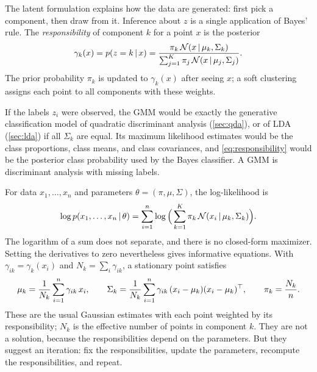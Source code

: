The latent formulation explains how the data are generated: first pick a component, then draw from it. Inference about $z$ is a single application of Bayes' rule. The \emph{responsibility} of component $k$ for a point $x$ is the posterior
\begin{equation}\label{eq:responsibility}
\gamma_k(x)=p(z=k\,|\, x)=\frac{\pi_k\,\mathcal{N}(x\,|\,\mu_k,\Sigma_k)}{\sum_{j=1}^K\pi_j\,\mathcal{N}(x\,|\,\mu_j,\Sigma_j)} .
\end{equation}
The prior probability $\pi_k$ is updated to $\gamma_k(x)$ after seeing $x$; a soft clustering assigns each point to all components with these weights.

\begin{remark}\label{rem:gmm-qda}
If the labels $z_i$ were observed, the GMM would be exactly the generative classification model of quadratic discriminant analysis (\cref{sec:qda}), or of LDA (\cref{sec:lda}) if all $\Sigma_k$ are equal. Its maximum likelihood estimates would be the class proportions, class means, and class covariances, and \eqref{eq:responsibility} would be the posterior class probability used by the Bayes classifier. A GMM is discriminant analysis with missing labels.
\end{remark}

For data $x_1,\dots,x_n$ and parameters $\theta=(\pi,\mu,\Sigma)$, the log-likelihood is
\begin{equation}\label{eq:gmm-loglik}
\log p(x_1,\dots,x_n\,|\,\theta)=\sum_{i=1}^n\log\Big(\sum_{k=1}^K\pi_k\,\mathcal{N}(x_i\,|\,\mu_k,\Sigma_k)\Big).
\end{equation}
The logarithm of a sum does not separate, and there is no closed-form maximizer. Setting the derivatives to zero nevertheless gives informative equations. With $\gamma_{ik}=\gamma_k(x_i)$ and $N_k=\sum_i\gamma_{ik}$, a stationary point satisfies
\begin{equation}\label{eq:gmm-stationary}
\mu_k=\frac1{N_k}\sum_{i=1}^n\gamma_{ik}\,x_i,\qquad
\Sigma_k=\frac1{N_k}\sum_{i=1}^n\gamma_{ik}\,(x_i-\mu_k)(x_i-\mu_k)^{\top},\qquad
\pi_k=\frac{N_k}{n}.
\end{equation}
These are the usual Gaussian estimates with each point weighted by its responsibility; $N_k$ is the effective number of points in component $k$. They are not a solution, because the responsibilities depend on the parameters. But they suggest an iteration: fix the responsibilities, update the parameters, recompute the responsibilities, and repeat.

